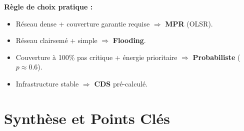 \documentclass[12pt,a4paper]{article}
\begin{document}
\begin{astuce}
\textbf{Règle de choix pratique :}
\begin{itemize}
    \item Réseau dense + couverture garantie requise $\Rightarrow$ \textbf{MPR} (OLSR).
    \item Réseau clairsemé + simple $\Rightarrow$ \textbf{Flooding}.
    \item Couverture à 100\% pas critique + énergie prioritaire $\Rightarrow$
          \textbf{Probabiliste} ($p \approx 0.6$).
    \item Infrastructure stable $\Rightarrow$ \textbf{CDS} pré-calculé.
\end{itemize}
\end{astuce}

\section{Synthèse et Points Clés}
\end{document}
